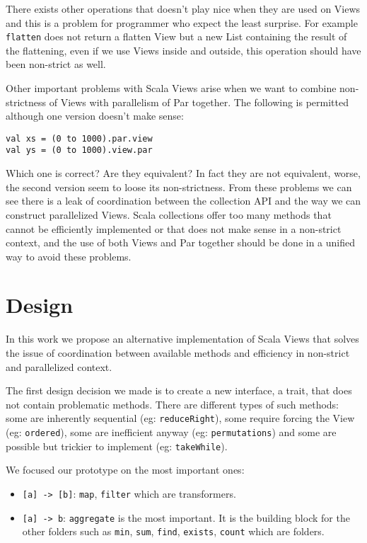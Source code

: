 \documentclass[a4paper,12pt,twocolumn]{article}
\begin{document}
There exists other operations that doesn't play nice when they are used on Views and this is a problem for programmer who expect the least surprise.
For example \verb|flatten| does not return a flatten View but a new List containing the result of the flattening, even if we use Views inside and outside, this operation should have been non-strict as well.

Other important problems with Scala Views arise when we want to combine non-strictness of Views with parallelism of Par together.
The following is permitted although one version doesn't make sense:

\begin{lstlisting}
val xs = (0 to 1000).par.view
val ys = (0 to 1000).view.par
\end{lstlisting}

Which one is correct? Are they equivalent? In fact they are not equivalent, worse, the second version seem to loose its non-strictness.
From these problems we can see there is a leak of coordination between the collection API and the way we can construct parallelized Views.
Scala collections offer too many methods that cannot be efficiently implemented or that does not make sense in a non-strict context, and the use of both Views and Par together should be done in a unified way to avoid these problems.


\section{Design}
In this work we propose an alternative implementation of Scala Views that solves the issue of coordination between available methods and efficiency in non-strict and parallelized context.

The first design decision we made is to create a new interface, a trait, that does not contain problematic methods.
There are different types of such methods: some are inherently sequential (eg: \verb|reduceRight|), some require forcing the View (eg: \verb|ordered|), some are inefficient anyway (eg: \verb|permutations|) and some are possible but trickier to implement (eg: \verb|takeWhile|).

We focused our prototype on the most important ones:
\begin{itemize}
    \item \verb|[a] -> [b]|: \verb|map|, \verb|filter| which are transformers.
    \item \verb|[a] -> b|: \verb|aggregate| is the most important. It is the building block for the other folders such as \verb|min|, \verb|sum|, \verb|find|, \verb|exists|, \verb|count| which are folders.
\end{itemize}
\end{document}

